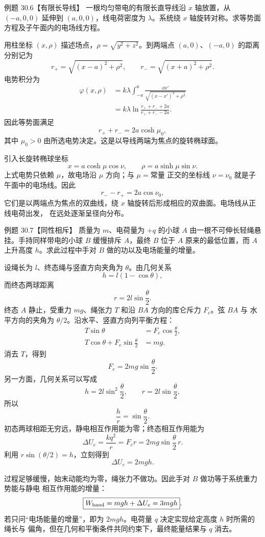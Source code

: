 \Needspace{0.36\textheight}
\begin{origexamplebox}{例题 30.6【有限长导线】}
一根均匀带电的有限长直导线沿 $x$ 轴放置，从 $(-a,0,0)$ 延伸到 $(a,0,0)$，线电荷密度为
$\lambda$。系统绕 $x$ 轴旋转对称。求等势面方程及子午面内的电场线方程。
\finiteLineDiagramThirty
\end{origexamplebox}

\begin{xesolution}
用柱坐标 $(x,\rho)$ 描述场点，$\rho=\sqrt{y^2+z^2}$。到两端点 $(a,0)$、$(-a,0)$ 的距离
分别记为
\[
  r_+=\sqrt{(x-a)^2+\rho^2},
  \qquad
  r_-=\sqrt{(x+a)^2+\rho^2}.
\]
电势积分为
\begin{align*}
  \varphi(x,\rho)
  &=k\lambda\int_{-a}^a
  \frac{\dd x'}{\sqrt{(x-x')^2+\rho^2}}\\
  &=\boxed{k\lambda\ln
  \frac{r_++r_-+2a}{r_++r_--2a}}.
\end{align*}
因此等势面满足
\[
  \boxed{r_++r_-=2a\cosh\mu_0},
\]
其中 $\mu_0>0$ 由所选电势决定。这是以导线两端为焦点的旋转椭球面。

引入长旋转椭球坐标
\[
  x=a\cosh\mu\cos\nu,
  \qquad
  \rho=a\sinh\mu\sin\nu.
\]
上式电势只依赖 $\mu$，故电场沿 $\mu$ 方向；与 $\mu=\text{常量}$ 正交的坐标线
$\nu=\nu_0$ 就是子午面中的电场线。因此
\[
  \boxed{r_--r_+=2a\cos\nu_0},
\]
它们是以两端点为焦点的双曲线，绕 $x$ 轴旋转后形成相应的双曲面。电场线从正线电荷出发，
在远处逐渐呈径向分布。
\end{xesolution}

\Needspace{0.36\textheight}
\begin{origexamplebox}{例题 30.7【同性相斥】}
质量为 $m$、电荷量为 $+q$ 的小球 $A$ 由一根不可伸长轻绳悬挂。手持同样带电的小球 $B$
缓慢排斥 $A$，最终 $B$ 位于 $A$ 原来的最低位置，而 $A$ 上升高度 $h$。求此过程中手对
$B$ 做的功以及电场能量的增量。
\repulsionDiagram
\end{origexamplebox}

\begin{xesolution}
设绳长为 $l$、终态绳与竖直方向夹角为 $\theta$。由几何关系
\[
  h=l(1-\cos\theta),
\]
而终态两球距离
\[
  r=2l\sin\frac\theta2.
\]
终态 $A$ 静止，受重力 $mg$、绳张力 $T$ 和沿 $BA$ 方向的库仑斥力 $F_e$。弦 $BA$ 与
水平方向的夹角为 $\theta/2$。沿水平、竖直方向列平衡方程：
\begin{align*}
  T\sin\theta&=F_e\cos\frac\theta2,\\
  T\cos\theta+F_e\sin\frac\theta2&=mg.
\end{align*}
消去 $T$，得到
\[
  \boxed{F_e=2mg\sin\frac\theta2}.
\]
另一方面，几何关系可以写成
\[
  h=2l\sin^2\frac\theta2,
  \qquad
  r=2l\sin\frac\theta2,
\]
所以
\[
  \frac hr=\sin\frac\theta2.
\]
初态两球相距无穷远，静电相互作用能为零；终态相互作用能为
\[
  \Delta U_e=\frac{kq^2}{r}=F_er
  =2mg\sin\frac\theta2\,r.
\]
利用 $r\sin(\theta/2)=h$，立刻得到
\[
  \boxed{\Delta U_e=2mgh}.
\]

过程足够缓慢，始末动能均为零，绳张力不做功。因此手对 $B$ 做功等于系统重力势能与静电
相互作用能的增量：
\[
  \boxed{W_{\rm hand}=mgh+\Delta U_e=3mgh}.
\]
若只问“电场能量的增量”，即为 $2mgh$。电荷量 $q$ 决定实现给定高度 $h$ 时所需的绳长与
偏角，但在几何和平衡条件共同约束下，最终能量结果与 $q$ 消去。
\end{xesolution}

